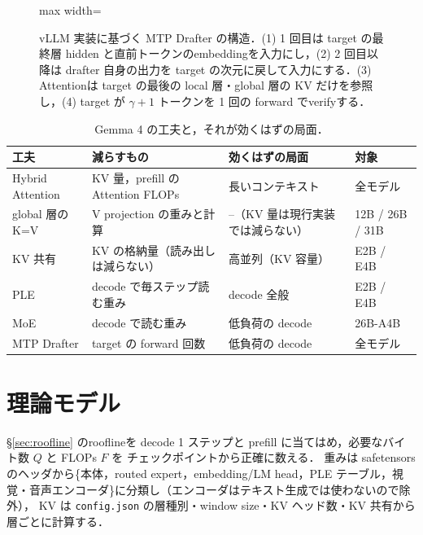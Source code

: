 \documentclass[a4paper,10pt]{ltjsarticle}
\begin{document}
\begin{figure}[htbp]\centering
\begin{adjustbox}{max width=\linewidth}\end{adjustbox}
\caption{vLLM 実装に基づく MTP Drafter の構造．(1) 1 回目は target の最終層 hidden と直前トークンのembeddingを入力にし，(2) 2 回目以降は drafter 自身の出力を target の次元に戻して入力にする．(3) Attentionは target の最後の local 層・global 層の KV だけを参照し，(4) target が $\gamma+1$ トークンを 1 回の forward でverifyする．}
\label{fig:mtp-arch}
\end{figure}





\begin{table}[htbp]\centering\small
\caption{Gemma 4 の工夫と，それが効くはずの局面．}
\label{tab:arch-effect}
\begin{tabular}{llll}\toprule
工夫 & 減らすもの & 効くはずの局面 & 対象 \\\midrule
Hybrid Attention & KV 量，prefill のAttention FLOPs & 長いコンテキスト & 全モデル \\
global 層の K=V & V projection の重みと計算 & --（KV 量は現行実装では減らない） & 12B / 26B / 31B \\
KV 共有 & KV の格納量（読み出しは減らない） & 高並列（KV 容量） & E2B / E4B \\
PLE & decode で毎ステップ読む重み & decode 全般 & E2B / E4B \\
MoE & decode で読む重み & 低負荷の decode & 26B-A4B \\
MTP Drafter & target の forward 回数 & 低負荷の decode & 全モデル \\
\bottomrule\end{tabular}
\end{table}

\section{理論モデル}
\label{sec:theory}
\S\ref{sec:roofline} のrooflineを decode 1 ステップと prefill に当てはめ，必要なバイト数 $Q$ と FLOPs $F$ を
チェックポイントから正確に数える．
重みは safetensors のヘッダから\{本体，routed expert，embedding/LM head，PLE テーブル，視覚・音声エンコーダ\}に分類し（エンコーダはテキスト生成では使わないので除外），
KV は \texttt{config.json} の層種別・window size・KV ヘッド数・KV 共有から層ごとに計算する．
\end{document}

